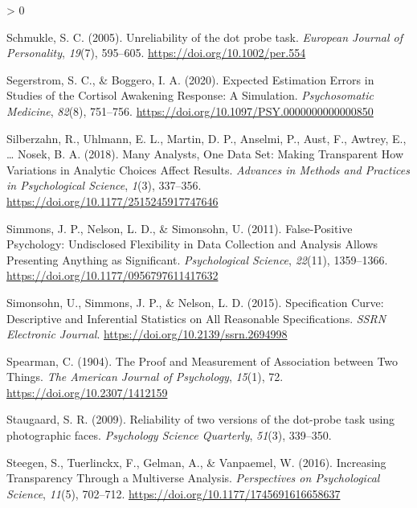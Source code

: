 \documentclass[
  english,
  man,floatsintext]{apa6}
\newlength{\cslhangindent}
\newenvironment{CSLReferences}[2] %
 {%
  \setlength{\parindent}{0pt}
  \ifodd #1 \everypar{\setlength{\hangindent}{\cslhangindent}}\ignorespaces\fi
  \ifnum #2 > 0
  \setlength{\parskip}{#2\baselineskip}
  \fi
 }%
 {}
\begin{document}
\begin{CSLReferences}{1}{0}
\leavevmode\hypertarget{ref-schmukle_unreliability_2005}{}%
Schmukle, S. C. (2005). Unreliability of the dot probe task. \emph{European Journal of Personality}, \emph{19}(7), 595--605. \url{https://doi.org/10.1002/per.554}

\leavevmode\hypertarget{ref-segerstrom_expected_2020}{}%
Segerstrom, S. C., \& Boggero, I. A. (2020). Expected {Estimation} {Errors} in {Studies} of the {Cortisol} {Awakening} {Response}: {A} {Simulation}. \emph{Psychosomatic Medicine}, \emph{82}(8), 751--756. \url{https://doi.org/10.1097/PSY.0000000000000850}

\leavevmode\hypertarget{ref-silberzahn_many_2018}{}%
Silberzahn, R., Uhlmann, E. L., Martin, D. P., Anselmi, P., Aust, F., Awtrey, E., \ldots{} Nosek, B. A. (2018). Many {Analysts}, {One} {Data} {Set}: {Making} {Transparent} {How} {Variations} in {Analytic} {Choices} {Affect} {Results}. \emph{Advances in Methods and Practices in Psychological Science}, \emph{1}(3), 337--356. \url{https://doi.org/10.1177/2515245917747646}

\leavevmode\hypertarget{ref-simmons_false-positive_2011}{}%
Simmons, J. P., Nelson, L. D., \& Simonsohn, U. (2011). False-{Positive} {Psychology}: {Undisclosed} {Flexibility} in {Data} {Collection} and {Analysis} {Allows} {Presenting} {Anything} as {Significant}. \emph{Psychological Science}, \emph{22}(11), 1359--1366. \url{https://doi.org/10.1177/0956797611417632}

\leavevmode\hypertarget{ref-simonsohn_specification_2015}{}%
Simonsohn, U., Simmons, J. P., \& Nelson, L. D. (2015). Specification {Curve}: {Descriptive} and {Inferential} {Statistics} on {All} {Reasonable} {Specifications}. \emph{SSRN Electronic Journal}. \url{https://doi.org/10.2139/ssrn.2694998}

\leavevmode\hypertarget{ref-spearman_proof_1904}{}%
Spearman, C. (1904). The {Proof} and {Measurement} of {Association} between {Two} {Things}. \emph{The American Journal of Psychology}, \emph{15}(1), 72. \url{https://doi.org/10.2307/1412159}

\leavevmode\hypertarget{ref-staugaard_reliability_2009}{}%
Staugaard, S. R. (2009). Reliability of two versions of the dot-probe task using photographic faces. \emph{Psychology Science Quarterly}, \emph{51}(3), 339--350.

\leavevmode\hypertarget{ref-steegen_increasing_2016}{}%
Steegen, S., Tuerlinckx, F., Gelman, A., \& Vanpaemel, W. (2016). Increasing {Transparency} {Through} a {Multiverse} {Analysis}. \emph{Perspectives on Psychological Science}, \emph{11}(5), 702--712. \url{https://doi.org/10.1177/1745691616658637}


\end{CSLReferences}
\end{document}
